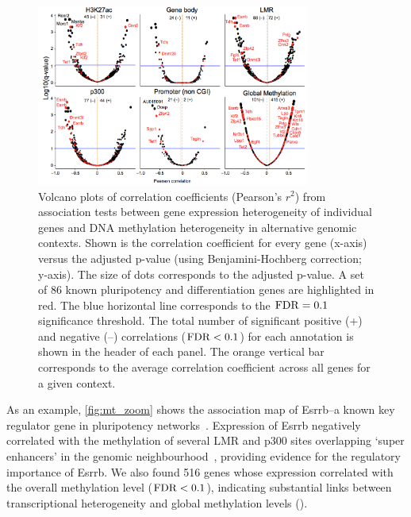\begin{figure}[htbp!]
\centering
\includegraphics[width=0.8\textwidth]{gene_volcano}
\caption[Volcano plots of correlation coefficients.]{Volcano plots of correlation coefficients (Pearson's $r^2$) from association tests between gene expression heterogeneity of individual genes and DNA methylation heterogeneity in alternative genomic contexts. Shown is the correlation coefficient for every gene (x-axis) versus the adjusted p-value (using Benjamini-Hochberg correction; y-axis). The size of dots corresponds to the adjusted p-value. A set of 86 known pluripotency and differentiation genes are highlighted in red. The blue horizontal line corresponds to the $\operatorname{FDR}=0.1$ significance threshold. The total number of significant positive (+) and negative (–) correlations ($\operatorname{FDR}<0.1$) for each annotation is shown in the header of each panel. The orange vertical bar corresponds to the average correlation coefficient across all genes for a given context.}
\label{fig:mt_gene_volcano}
\end{figure}

As an example, \cref{fig:mt_zoom} shows the association map of Esrrb--a known key regulator gene in pluripotency networks~\citep{papp_pluripotency_2012}. Expression of Esrrb negatively correlated with the methylation of several LMR and p300 sites overlapping `super enhancers' in the genomic neighbourhood~\citep{whyte_master_2013}, providing evidence for the regulatory importance of Esrrb. We also found 516 genes whose expression correlated with the overall methylation level ($\operatorname{FDR}<0.1$), indicating substantial links between transcriptional heterogeneity and global methylation levels ().

